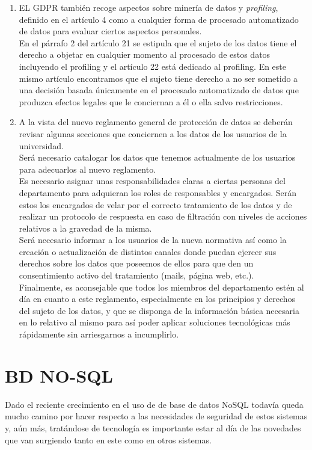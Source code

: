 \documentclass[a4paper,oneside]{article}
\begin{document}
\begin{enumerate}[label=\textbf{\alph*)}]
\item 
EL GDPR también recoge aspectos sobre minería de datos y \textit{profiling}, definido en el artículo 4 como a cualquier forma de procesado automatizado de datos para evaluar ciertos aspectos personales.\\
En el párrafo 2 del artículo 21 se estipula que el sujeto de los datos tiene el derecho a objetar en cualquier momento al procesado de estos datos incluyendo el profiling y el artículo 22 está dedicado al profiling. En este mismo artículo encontramos que el sujeto tiene derecho a no ser sometido a una decisión basada únicamente en el procesado automatizado de datos que produzca efectos legales que le conciernan a él o ella salvo restricciones.

\item 
A la vista del nuevo reglamento general de protección de datos se deberán revisar algunas secciones que conciernen a los datos de los usuarios de la universidad.\\
Será necesario catalogar los datos que tenemos actualmente de los usuarios para adecuarlos al nuevo reglamento.\\
Es necesario asignar unas responsabilidades claras a ciertas personas del departamento para adquieran los roles de responsables y encargados. Serán estos los encargados de velar por el correcto tratamiento de los datos y de realizar un protocolo de respuesta en caso de filtración con niveles de acciones relativos a la gravedad de la misma.\\
Será necesario informar a los usuarios de la nueva normativa así como la creación o actualización de distintos canales donde puedan ejercer sus derechos sobre los datos que poseemos de ellos para que den un consentimiento activo del tratamiento (mails, página web, etc.).\\
Finalmente, es aconsejable que todos los miembros del departamento estén al día en cuanto a este reglamento, especialmente en los principios y derechos del sujeto de los datos, y que se disponga de la información básica necesaria en lo relativo al mismo para así poder aplicar soluciones tecnológicas más rápidamente sin arriesgarnos a incumplirlo.

\end{enumerate}

\section{BD NO-SQL}
Dado el reciente crecimiento en el uso de de base de datos NoSQL todavía queda mucho camino por hacer respecto a las necesidades de seguridad de estos sistemas y, aún más, tratándose de tecnología es importante estar al día de las novedades que van surgiendo tanto en este como en otros sistemas.\\
\end{document}
